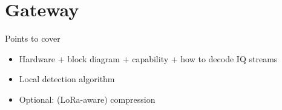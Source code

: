 \section{Gateway}
\label{sec:gateway}

{\color{blue} Points to cover
\begin{itemize}
    \item Hardware + block diagram + capability + how to decode IQ streams
    \item Local detection algorithm
    \item Optional: (LoRa-aware) compression
\end{itemize}

}